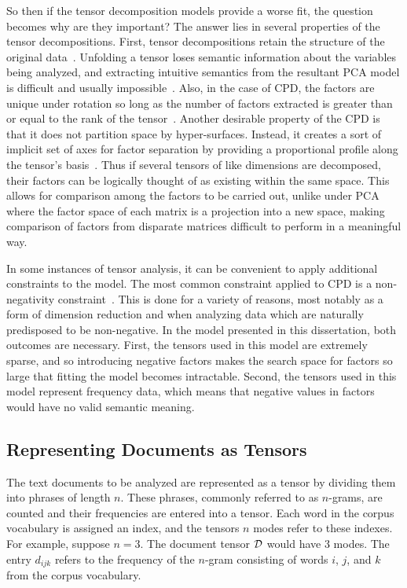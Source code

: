 \documentclass[../dissertation.tex]{subfiles}
\begin{document}
So then if the tensor decomposition models provide a worse fit, the
question becomes why are they important?  The answer lies in several
properties of the tensor decompositions.  First, tensor decompositions
retain the structure of the original data~\cite{harshman1970,
  kolda2009}.  Unfolding a tensor loses semantic information about the
variables being analyzed, and extracting intuitive semantics from the
resultant PCA model is difficult and usually
impossible~\cite{bro1997}.  Also, in the case of CPD, the factors are
unique under rotation so long as the number of factors extracted is
greater than or equal to the rank of the tensor~\cite{harshman1994}.
Another desirable property of the CPD is that it does not partition
space by hyper-surfaces.  Instead, it creates a sort of implicit set
of axes for factor separation by providing a proportional profile
along the tensor's basis~\cite{harshman1994}.  Thus if several tensors
of like dimensions are decomposed, their factors can be logically
thought of as existing within the same space.  This allows for
comparison among the factors to be carried out, unlike under PCA where
the factor space of each matrix is a projection into a new space,
making comparison of factors from disparate matrices difficult to
perform in a meaningful way.

In some instances of tensor analysis, it can be convenient to apply
additional constraints to the model.  The most common constraint
applied to CPD is a non-negativity constraint~\cite{liu2012sparse,
  bro1997, kolda2009}.  This is done for a variety of reasons, most
notably as a form of dimension reduction and when analyzing data which
are naturally predisposed to be non-negative.  In the model presented
in this dissertation, both outcomes are necessary.  First, the tensors
used in this model are extremely sparse, and so introducing negative
factors makes the search space for factors so large that fitting the
model becomes intractable.  Second, the tensors used in this model
represent frequency data, which means that negative values in factors
would have no valid semantic meaning.

\subsection{Representing Documents as Tensors}
The text documents to be analyzed are represented as a tensor by
dividing them into phrases of length $n$.  These phrases, commonly
referred to as $n$-grams, are counted and their frequencies are
entered into a tensor.  Each word in the corpus vocabulary is assigned
an index, and the tensors $n$ modes refer to these indexes.  For
example, suppose $n=3$.  The document tensor $\mathcal{D}$ would have
3 modes.  The entry $d_{ijk}$ refers to the frequency of the
$n$-gram consisting of words $i$, $j$, and $k$ from the corpus
vocabulary.  
\end{document}

